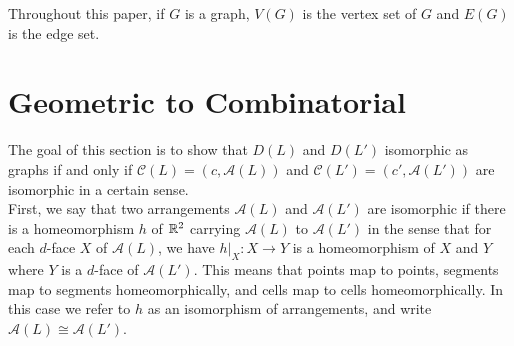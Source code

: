 \documentclass[11pt, oneside]{article}
\begin{document}
Throughout this paper, if $G$ is a graph, $V(G)$ is the vertex set of $G$ and $E(G)$ is the edge set.

\section{Geometric to Combinatorial}
The goal of this section is to show that $D(L)$ and $D(L')$ isomorphic as graphs if and only if $\mathcal{C}(L) = (c, \mathcal{A}(L))$ and $\mathcal{C}(L') = (c', \mathcal{A}(L'))$ are isomorphic in a certain sense.\\

First, we say that two arrangements $\mathcal{A }(L)$ and $\mathcal{A} (L')$ are isomorphic if there is a homeomorphism $h$ of $\mathbb{R}^2$ carrying $\mathcal{A }(L)$ to $\mathcal{A} (L')$ in the sense that for each $d$-face $X$ of $\mathcal{A}(L)$, we have $h|_X: X \to Y$ is a homeomorphism of $X$ and $Y$ where $Y$ is a $d$-face of $\mathcal{A}(L')$. This means that points map to points, segments map to segments homeomorphically, and cells map to cells homeomorphically. In this case we refer to $h$ as an isomorphism of arrangements, and write $\mathcal{A }(L) \cong \mathcal{A} (L')$. \\
\end{document}
